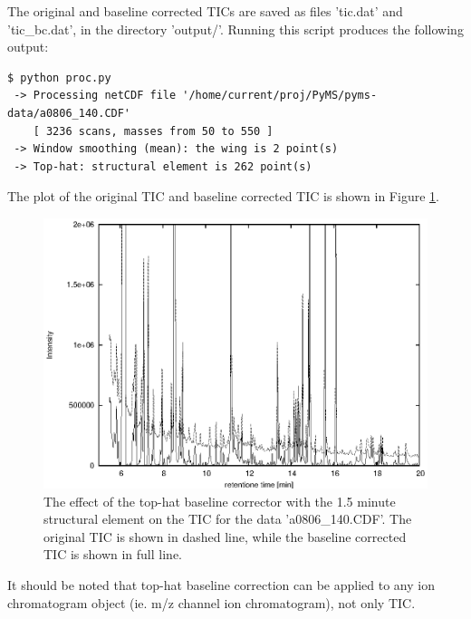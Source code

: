 \noindent
The original and baseline corrected TICs are saved as files 'tic.dat' and
'tic\_bc.dat', in the directory 'output/'. Running this script produces the
following output:

\begin{verbatim}
$ python proc.py
 -> Processing netCDF file '/home/current/proj/PyMS/pyms-data/a0806_140.CDF'
    [ 3236 scans, masses from 50 to 550 ]
 -> Window smoothing (mean): the wing is 2 point(s)
 -> Top-hat: structural element is 262 point(s)
\end{verbatim}

\noindent
The plot of the original TIC and baseline corrected TIC is shown in
Figure \ref{fig:bc-tophat}.

\begin{figure}[htp]
\begin{center}
\includegraphics{graphics/pyms-test/tic_bc_tophat.eps}
\caption{The effect of the top-hat baseline corrector with the 1.5 minute
structural element on the TIC for the data 'a0806\_140.CDF'.  The original
TIC is shown in dashed line, while the baseline corrected TIC is shown in
full line.}
\label{fig:bc-tophat}
\end{center}
\end{figure}

It should be noted that top-hat baseline correction can be applied to any
ion chromatogram object (ie. m/z channel ion chromatogram), not only TIC.


